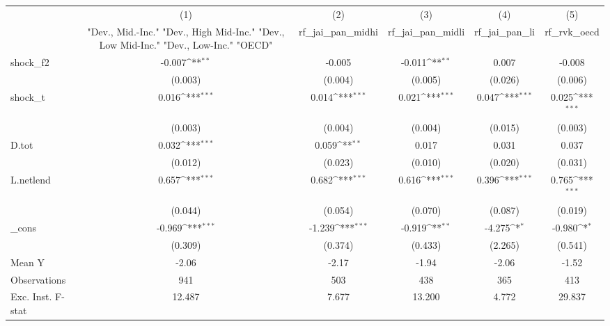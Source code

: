 {
\def\sym#1{\ifmmode^{#1}\else\(^{#1}\)\fi}
\begin{tabular}{l*{5}{c}}
\toprule
            &\multicolumn{1}{c}{(1)}&\multicolumn{1}{c}{(2)}&\multicolumn{1}{c}{(3)}&\multicolumn{1}{c}{(4)}&\multicolumn{1}{c}{(5)}\\
            &\multicolumn{1}{c}{ "Dev., Mid.-Inc." "Dev., High Mid-Inc." "Dev., Low Mid-Inc." "Dev., Low-Inc." "OECD" }&\multicolumn{1}{c}{rf\_jai\_pan\_midhi}&\multicolumn{1}{c}{rf\_jai\_pan\_midli}&\multicolumn{1}{c}{rf\_jai\_pan\_li}&\multicolumn{1}{c}{rf\_rvk\_oecd}\\
\midrule
shock\_f2    &      -0.007\sym{**} &      -0.005         &      -0.011\sym{**} &       0.007         &      -0.008         \\
            &     (0.003)         &     (0.004)         &     (0.005)         &     (0.026)         &     (0.006)         \\
\addlinespace
shock\_t     &       0.016\sym{***}&       0.014\sym{***}&       0.021\sym{***}&       0.047\sym{***}&       0.025\sym{***}\\
            &     (0.003)         &     (0.004)         &     (0.004)         &     (0.015)         &     (0.003)         \\
\addlinespace
D.tot       &       0.032\sym{***}&       0.059\sym{**} &       0.017         &       0.031         &       0.037         \\
            &     (0.012)         &     (0.023)         &     (0.010)         &     (0.020)         &     (0.031)         \\
\addlinespace
L.netlend   &       0.657\sym{***}&       0.682\sym{***}&       0.616\sym{***}&       0.396\sym{***}&       0.765\sym{***}\\
            &     (0.044)         &     (0.054)         &     (0.070)         &     (0.087)         &     (0.019)         \\
\addlinespace
\_cons      &      -0.969\sym{***}&      -1.239\sym{***}&      -0.919\sym{**} &      -4.275\sym{*}  &      -0.980\sym{*}  \\
            &     (0.309)         &     (0.374)         &     (0.433)         &     (2.265)         &     (0.541)         \\
\midrule
Mean Y      &       -2.06         &       -2.17         &       -1.94         &       -2.06         &       -1.52         \\
Observations&         941         &         503         &         438         &         365         &         413         \\
Exc. Inst. F-stat&      12.487         &       7.677         &      13.200         &       4.772         &      29.837         \\
\bottomrule
\end{tabular}
}
